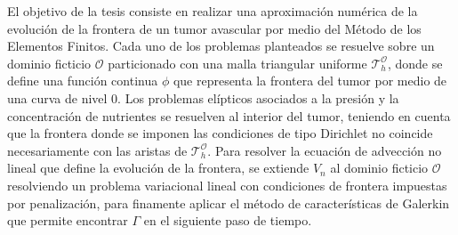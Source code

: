 El objetivo de la tesis consiste en realizar una aproximación numérica de la evolución de la frontera de un tumor avascular por medio del Método de los Elementos Finitos. Cada uno de los problemas planteados se resuelve sobre  un  dominio ficticio $\mathcal{O}$ particionado con una malla triangular uniforme $\mathcal{T}_h^\mathcal{O}$, donde se define una función continua $\phi$ que representa la frontera del tumor por medio de una curva de nivel 0. Los problemas elípticos asociados a la presión y la concentración de nutrientes se resuelven al interior del  tumor, teniendo en cuenta que la frontera donde se imponen las condiciones de tipo Dirichlet no coincide necesariamente con las aristas de  $\mathcal{T}_h^\mathcal{O}$. Para resolver la ecuación de advección no lineal que define la evolución de la frontera, se extiende $V_n$ al dominio ficticio $\mathcal{O}$ resolviendo un problema variacional lineal con condiciones  de frontera impuestas por penalización, para finamente aplicar el método de características de Galerkin que permite encontrar $\Gamma$ en el siguiente paso de tiempo.
%

